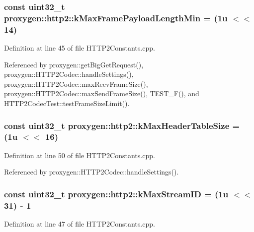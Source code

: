 \subsubsection[{k\+Max\+Frame\+Payload\+Length\+Min}]{\setlength{\rightskip}{0pt plus 5cm}const uint32\+\_\+t proxygen\+::http2\+::k\+Max\+Frame\+Payload\+Length\+Min = (1u $<$$<$ 14)}\label{namespaceproxygen_1_1http2_a31534407d24163973cc35bbd0f98a0ba}


Definition at line 45 of file H\+T\+T\+P2\+Constants.\+cpp.



Referenced by proxygen\+::get\+Big\+Get\+Request(), proxygen\+::\+H\+T\+T\+P2\+Codec\+::handle\+Settings(), proxygen\+::\+H\+T\+T\+P2\+Codec\+::max\+Recv\+Frame\+Size(), proxygen\+::\+H\+T\+T\+P2\+Codec\+::max\+Send\+Frame\+Size(), T\+E\+S\+T\+\_\+\+F(), and H\+T\+T\+P2\+Codec\+Test\+::test\+Frame\+Size\+Limit().

\subsubsection[{k\+Max\+Header\+Table\+Size}]{\setlength{\rightskip}{0pt plus 5cm}const uint32\+\_\+t proxygen\+::http2\+::k\+Max\+Header\+Table\+Size = (1u $<$$<$ 16)}\label{namespaceproxygen_1_1http2_adb70b297ac61d3f0b8729b131cae4cad}


Definition at line 50 of file H\+T\+T\+P2\+Constants.\+cpp.



Referenced by proxygen\+::\+H\+T\+T\+P2\+Codec\+::handle\+Settings().

\subsubsection[{k\+Max\+Stream\+ID}]{\setlength{\rightskip}{0pt plus 5cm}const uint32\+\_\+t proxygen\+::http2\+::k\+Max\+Stream\+ID = (1u $<$$<$ 31) -\/ 1}\label{namespaceproxygen_1_1http2_a414777c98f0a5c5e78f3d058c8480eaf}


Definition at line 47 of file H\+T\+T\+P2\+Constants.\+cpp.

